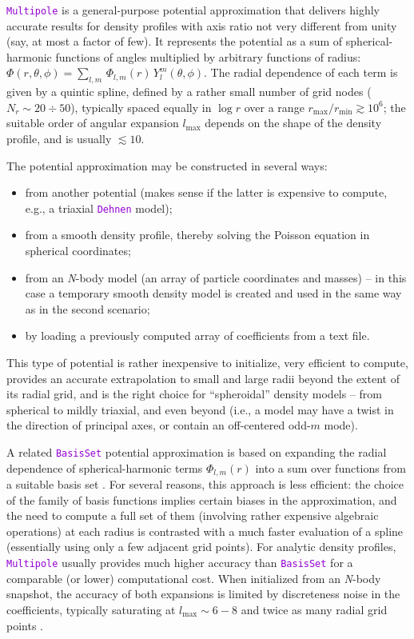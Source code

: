 \documentclass[12pt]{article}
\newcommand{\Nbody}{\textsl{N}-body\xspace}
\newcommand{\ttt}[1]{\textcolor{darkviolet}{\texttt{#1}}}
\begin{document}
\ttt{Multipole} is a general-purpose potential approximation that delivers highly accurate results for density profiles with axis ratio not very different from unity (say, at most a factor of few). It represents the potential as a sum of spherical-harmonic functions of angles multiplied by arbitrary functions of radius: $\Phi(r,\theta,\phi) = \sum_{l,m}\, \Phi_{l,m}(r)\, Y_l^m(\theta,\phi)$. The radial dependence of each term is given by a quintic spline, defined by a rather small number of grid nodes ($N_r\sim 20\div 50$), typically spaced equally in $\log r$ over a range $r_\mathrm{max}/r_\mathrm{min} \gtrsim 10^6$; the suitable order of angular expansion $l_\mathrm{max}$ depends on the shape of the density profile, and is usually $\lesssim 10$.

The potential approximation may be constructed in several ways:
\begin{itemize} \setlength{\parskip}{0pt} \setlength{\itemsep}{2pt}
\item from another potential (makes sense if the latter is expensive to compute, e.g., a triaxial \ttt{Dehnen} model);
\item from a smooth density profile, thereby solving the Poisson equation in spherical coordinates;
\item from an \Nbody model (an array of particle coordinates and masses) -- in this case a temporary smooth density model is created and used in the same way as in the second scenario;
\item by loading a previously computed array of coefficients from a text file.
\end{itemize}

This type of potential is rather inexpensive to initialize, very efficient to compute, provides an accurate extrapolation to small and large radii beyond the extent of its radial grid, and is the right choice for ``spheroidal'' density models -- from spherical to mildly triaxial, and even beyond (i.e., a model may have a twist in the direction of principal axes, or contain an off-centered odd-$m$ mode).

A related \ttt{BasisSet} potential approximation is based on expanding the radial dependence of spherical-harmonic terms $\Phi_{l,m}(r)$ into a sum over functions from a suitable basis set \cite{HernquistOstriker1992,Zhao1996}. For several reasons, this approach is less efficient: the choice of the family of basis functions implies certain biases in the approximation, and the need to compute a full set of them (involving rather expensive algebraic operations) at each radius is contrasted with a much faster evaluation of a spline (essentially using only a few adjacent grid points). For analytic density profiles, \ttt{Multipole} usually provides much higher accuracy than \ttt{BasisSet} for a comparable (or lower) computational cost. When initialized from an \Nbody snapshot, the accuracy of both expansions is limited by discreteness noise in the coefficients, typically saturating at $l_\mathrm{max} \sim 6-8$ and twice as many radial grid points \cite{Sanders2020}.
\end{document}
